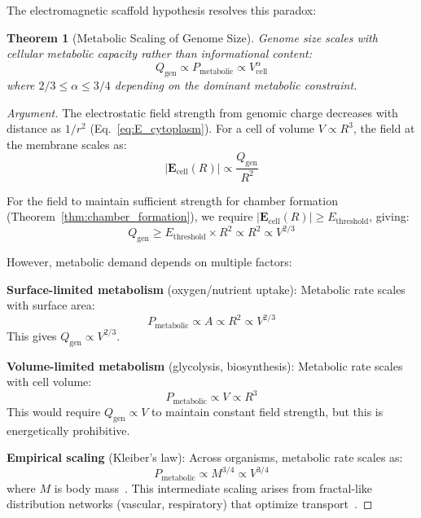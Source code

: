\documentclass[twocolumn,10pt,aps,prd,superscriptaddress,floatfix,nofootinbib]{revtex4-2}
\newtheorem{theorem}{Theorem}[section]
\theoremstyle{remark}
\begin{document}
The electromagnetic scaffold hypothesis resolves this paradox:

\begin{theorem}[Metabolic Scaling of Genome Size]
\label{thm:c_value}
Genome size scales with cellular metabolic capacity rather than informational content:
\begin{equation}
Q_{\mathrm{gen}} \propto P_{\mathrm{metabolic}} \propto V_{\mathrm{cell}}^{\alpha}
\label{eq:kleiber_genome}
\end{equation}
where $2/3 \leq \alpha \leq 3/4$ depending on the dominant metabolic constraint.
\end{theorem}

\begin{proof}[Argument]
The electrostatic field strength from genomic charge decreases with distance as $1/r^2$ (Eq.~\eqref{eq:E_cytoplasm}). For a cell of volume $V \propto R^3$, the field at the membrane scales as:
\begin{equation}
|\mathbf{E}_{\mathrm{cell}}(R)| \propto \frac{Q_{\mathrm{gen}}}{R^2}
\end{equation}

For the field to maintain sufficient strength for chamber formation (Theorem~\ref{thm:chamber_formation}), we require $|\mathbf{E}_{\mathrm{cell}}(R)| \geq E_{\mathrm{threshold}}$, giving:
\begin{equation}
Q_{\mathrm{gen}} \geq E_{\mathrm{threshold}} \times R^2 \propto R^2 \propto V^{2/3}
\end{equation}

However, metabolic demand depends on multiple factors:

\textbf{Surface-limited metabolism} (oxygen/nutrient uptake): Metabolic rate scales with surface area:
\begin{equation}
P_{\mathrm{metabolic}} \propto A \propto R^2 \propto V^{2/3}
\end{equation}
This gives $Q_{\mathrm{gen}} \propto V^{2/3}$.

\textbf{Volume-limited metabolism} (glycolysis, biosynthesis): Metabolic rate scales with cell volume:
\begin{equation}
P_{\mathrm{metabolic}} \propto V \propto R^3
\end{equation}
This would require $Q_{\mathrm{gen}} \propto V$ to maintain constant field strength, but this is energetically prohibitive.

\textbf{Empirical scaling} (Kleiber's law): Across organisms, metabolic rate scales as:
\begin{equation}
P_{\mathrm{metabolic}} \propto M^{3/4} \propto V^{3/4}
\end{equation}
where $M$ is body mass~\cite{Kleiber1932}. This intermediate scaling arises from fractal-like distribution networks (vascular, respiratory) that optimize transport~\cite{West1997}.


\end{proof}
\end{document}
